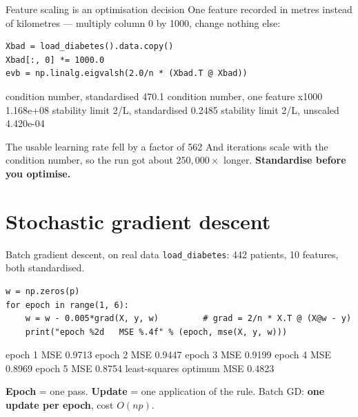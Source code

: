 \documentclass[aspectratio=169]{beamer}
\begin{document}
\begin{frame}[fragile]{Feature scaling is an optimisation decision}
One feature recorded in metres instead of kilometres --- multiply column 0 by
1000, change nothing else:
\begin{lstlisting}
Xbad = load_diabetes().data.copy()
Xbad[:, 0] *= 1000.0
evb = np.linalg.eigvalsh(2.0/n * (Xbad.T @ Xbad))
\end{lstlisting}
\begin{outblk}
condition number, standardised             470.1
condition number, one feature x1000   1.168e+08
stability limit 2/L, standardised         0.2485
stability limit 2/L, unscaled          4.420e-04
\end{outblk}
\begin{alertblock}{The usable learning rate fell by a factor of 562}
  \footnotesize And iterations scale with the condition number, so the run got
  about $250{,}000\times$ longer. \textbf{Standardise before you optimise.}
\end{alertblock}
\end{frame}

\section[SGD]{Stochastic gradient descent}
\label{sec:sgd}

\begin{frame}[fragile]{Batch gradient descent, on real data}
\texttt{load\_diabetes}: 442 patients, 10 features, both standardised.
\begin{lstlisting}
w = np.zeros(p)
for epoch in range(1, 6):
    w = w - 0.005*grad(X, y, w)         # grad = 2/n * X.T @ (X@w - y)
    print("epoch %2d   MSE %.4f" % (epoch, mse(X, y, w)))
\end{lstlisting}
\begin{outblk}
epoch  1   MSE 0.9713
epoch  2   MSE 0.9447
epoch  3   MSE 0.9199
epoch  4   MSE 0.8969
epoch  5   MSE 0.8754
least-squares optimum  MSE 0.4823
\end{outblk}
\begin{center}\small
  \textbf{Epoch} = one pass. \textbf{Update} = one application of the rule.
  Batch GD: \textbf{one update per epoch}, cost $O(np)$.
\end{center}
\end{frame}
\end{document}
